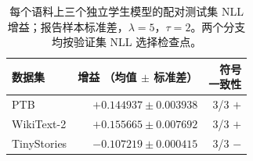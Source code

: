 \begin{table}[t]
\centering
\setlength{\tabcolsep}{5pt}
\begin{tabular}{lrr}
\toprule
数据集 & \shortstack{增益\\（均值 $\pm$ 标准差）} & \shortstack{符号\\一致性}\\
\midrule
PTB & $+0.144937\pm0.003938$ & 3/3 $+$\\
WikiText-2 & $+0.155665\pm0.007692$ & 3/3 $+$\\
TinyStories & $-0.107219\pm0.000415$ & 3/3 $-$\\
\bottomrule
\end{tabular}
\caption{每个语料上三个独立学生模型的配对测试集 NLL 增益；报告样本标准差，$\lambda=5$，$\tau=2$。两个分支均按验证集 NLL 选择检查点。}
\label{tab:cross_domain_transfer}
\end{table}
